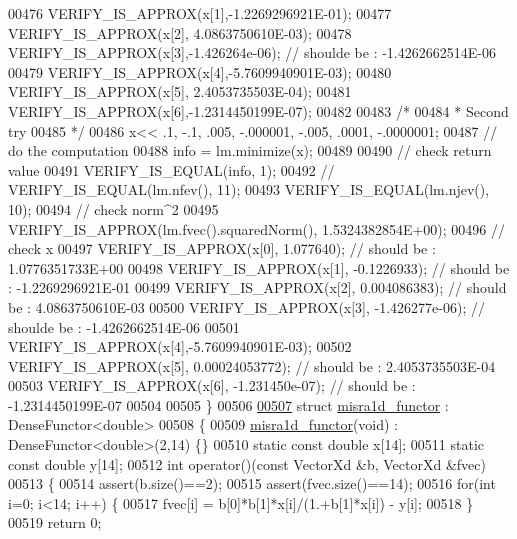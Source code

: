 \begin{DoxyCode}
00476   VERIFY\_IS\_APPROX(x[1],-1.2269296921E-01);
00477   VERIFY\_IS\_APPROX(x[2], 4.0863750610E-03);
00478   VERIFY\_IS\_APPROX(x[3],-1.426264e-06); \textcolor{comment}{// shoulde be : -1.4262662514E-06}
00479   VERIFY\_IS\_APPROX(x[4],-5.7609940901E-03);
00480   VERIFY\_IS\_APPROX(x[5], 2.4053735503E-04);
00481   VERIFY\_IS\_APPROX(x[6],-1.2314450199E-07);
00482 
00483   \textcolor{comment}{/*}
00484 \textcolor{comment}{   * Second try}
00485 \textcolor{comment}{   */}
00486   x<< .1, -.1, .005, -.000001, -.005, .0001, -.0000001;
00487   \textcolor{comment}{// do the computation}
00488   info = lm.minimize(x);
00489 
00490   \textcolor{comment}{// check return value}
00491   VERIFY\_IS\_EQUAL(info, 1);
00492 \textcolor{comment}{//   VERIFY\_IS\_EQUAL(lm.nfev(), 11);}
00493   VERIFY\_IS\_EQUAL(lm.njev(), 10);
00494   \textcolor{comment}{// check norm^2}
00495   VERIFY\_IS\_APPROX(lm.fvec().squaredNorm(), 1.5324382854E+00);
00496   \textcolor{comment}{// check x}
00497   VERIFY\_IS\_APPROX(x[0], 1.077640); \textcolor{comment}{// should be :  1.0776351733E+00}
00498   VERIFY\_IS\_APPROX(x[1], -0.1226933); \textcolor{comment}{// should be : -1.2269296921E-01}
00499   VERIFY\_IS\_APPROX(x[2], 0.004086383); \textcolor{comment}{// should be : 4.0863750610E-03}
00500   VERIFY\_IS\_APPROX(x[3], -1.426277e-06); \textcolor{comment}{// shoulde be : -1.4262662514E-06}
00501   VERIFY\_IS\_APPROX(x[4],-5.7609940901E-03);
00502   VERIFY\_IS\_APPROX(x[5], 0.00024053772); \textcolor{comment}{// should be : 2.4053735503E-04}
00503   VERIFY\_IS\_APPROX(x[6], -1.231450e-07); \textcolor{comment}{// should be : -1.2314450199E-07}
00504 
00505 \}
00506 
\hyperlink{structmisra1d__functor}{00507} \textcolor{keyword}{struct }\hyperlink{structmisra1d__functor}{misra1d\_functor} : DenseFunctor<double>
00508 \{
00509     \hyperlink{structmisra1d__functor}{misra1d\_functor}(\textcolor{keywordtype}{void}) : DenseFunctor<double>(2,14) \{\}
00510     \textcolor{keyword}{static} \textcolor{keyword}{const} \textcolor{keywordtype}{double} x[14];
00511     \textcolor{keyword}{static} \textcolor{keyword}{const} \textcolor{keywordtype}{double} y[14];
00512     \textcolor{keywordtype}{int} operator()(\textcolor{keyword}{const} VectorXd &b, VectorXd &fvec)
00513     \{
00514         assert(b.size()==2);
00515         assert(fvec.size()==14);
00516         \textcolor{keywordflow}{for}(\textcolor{keywordtype}{int} i=0; i<14; i++) \{
00517             fvec[i] = b[0]*b[1]*x[i]/(1.+b[1]*x[i]) - y[i];
00518         \}
00519         \textcolor{keywordflow}{return} 0;

\end{DoxyCode}
